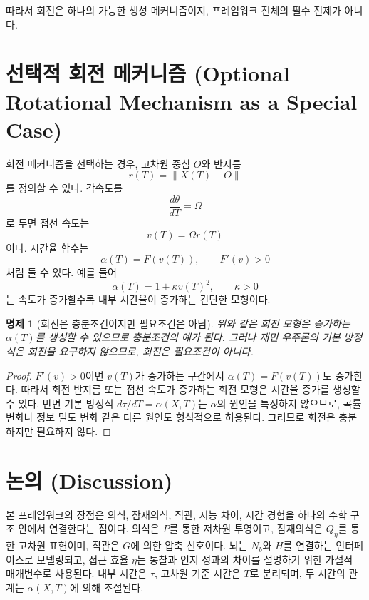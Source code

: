 \documentclass[11pt]{article}
\newtheorem{proposition}{명제}
\theoremstyle{remark}
\begin{document}
따라서 회전은 하나의 가능한 생성 메커니즘이지, 프레임워크 전체의 필수
전제가 아니다.

\section{선택적 회전 메커니즘 (Optional Rotational Mechanism as a Special Case)}

회전 메커니즘을 선택하는 경우, 고차원 중심 $O$와 반지름
\begin{equation}
  r(T)=\|X(T)-O\|
\end{equation}
를 정의할 수 있다. 각속도를
\begin{equation}
  \frac{d\theta}{dT}=\Omega
\end{equation}
로 두면 접선 속도는
\begin{equation}
  v(T)=\Omega r(T)
\end{equation}
이다. 시간율 함수는
\begin{equation}
  \alpha(T)=F(v(T)),\qquad F'(v)>0
\end{equation}
처럼 둘 수 있다. 예를 들어
\begin{equation}
  \alpha(T)=1+\kappa v(T)^2,\qquad \kappa>0
\end{equation}
는 속도가 증가할수록 내부 시간율이 증가하는 간단한 모형이다.

\begin{proposition}[회전은 충분조건이지만 필요조건은 아님]
위와 같은 회전 모형은 증가하는 $\alpha(T)$를 생성할 수 있으므로 충분조건의
예가 된다. 그러나 재민 우주론의 기본 방정식은 회전을 요구하지 않으므로,
회전은 필요조건이 아니다.
\end{proposition}

\begin{proof}
$F'(v)>0$이면 $v(T)$가 증가하는 구간에서 $\alpha(T)=F(v(T))$도 증가한다.
따라서 회전 반지름 또는 접선 속도가 증가하는 회전 모형은 시간율 증가를
생성할 수 있다. 반면 기본 방정식 $d\tau/dT=\alpha(X,T)$는 $\alpha$의
원인을 특정하지 않으므로, 곡률 변화나 정보 밀도 변화 같은 다른 원인도
형식적으로 허용된다. 그러므로 회전은 충분하지만 필요하지 않다.
\end{proof}

\section{논의 (Discussion)}

본 프레임워크의 장점은 의식, 잠재의식, 직관, 지능 차이, 시간 경험을 하나의
수학 구조 안에서 연결한다는 점이다. 의식은 $P$를 통한 저차원 투영이고,
잠재의식은 $Q_\eta$를 통한 고차원 표현이며, 직관은 $G$에 의한 압축 신호이다.
뇌는 $N_b$와 $H$를 연결하는 인터페이스로 모델링되고, 접근 효율 $\eta$는
통찰과 인지 성과의 차이를 설명하기 위한 가설적 매개변수로 사용된다.
내부 시간은 $\tau$, 고차원 기준 시간은 $T$로 분리되며, 두 시간의 관계는
$\alpha(X,T)$에 의해 조절된다.
\end{document}

